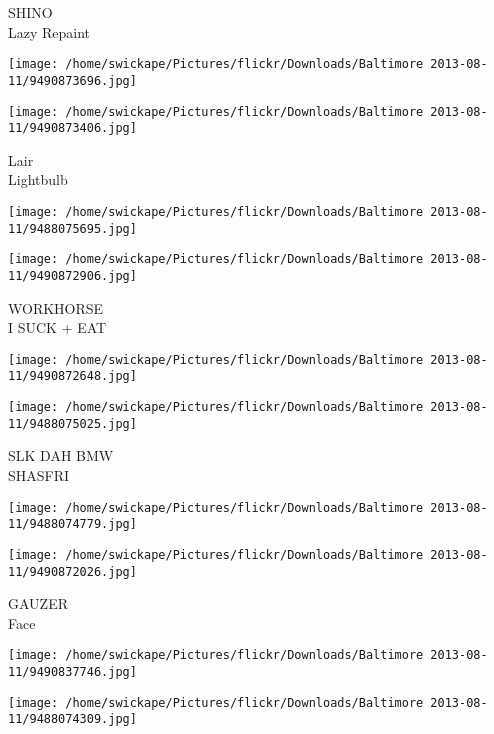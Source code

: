 \documentclass[10pt,letterpaper]{article}
\begin{document}
SHINO\\
Lazy Repaint\\
\pagebreak

\texttt{[image: /home/swickape/Pictures/flickr/Downloads/Baltimore 2013-08-11/9490873696.jpg]}

\vspace{0.25in}
\texttt{[image: /home/swickape/Pictures/flickr/Downloads/Baltimore 2013-08-11/9490873406.jpg]}

Lair\\
Lightbulb\\
\pagebreak

\texttt{[image: /home/swickape/Pictures/flickr/Downloads/Baltimore 2013-08-11/9488075695.jpg]}

\vspace{0.25in}
\texttt{[image: /home/swickape/Pictures/flickr/Downloads/Baltimore 2013-08-11/9490872906.jpg]}

WORKHORSE\\
I SUCK + EAT\\
\pagebreak

\texttt{[image: /home/swickape/Pictures/flickr/Downloads/Baltimore 2013-08-11/9490872648.jpg]}

\vspace{0.25in}
\texttt{[image: /home/swickape/Pictures/flickr/Downloads/Baltimore 2013-08-11/9488075025.jpg]}

SLK DAH BMW\\
SHASFRI\\
\pagebreak

\texttt{[image: /home/swickape/Pictures/flickr/Downloads/Baltimore 2013-08-11/9488074779.jpg]}

\vspace{0.25in}
\texttt{[image: /home/swickape/Pictures/flickr/Downloads/Baltimore 2013-08-11/9490872026.jpg]}

GAUZER\\
Face\\
\pagebreak

\texttt{[image: /home/swickape/Pictures/flickr/Downloads/Baltimore 2013-08-11/9490837746.jpg]}

\vspace{0.25in}
\texttt{[image: /home/swickape/Pictures/flickr/Downloads/Baltimore 2013-08-11/9488074309.jpg]}
\end{document}
